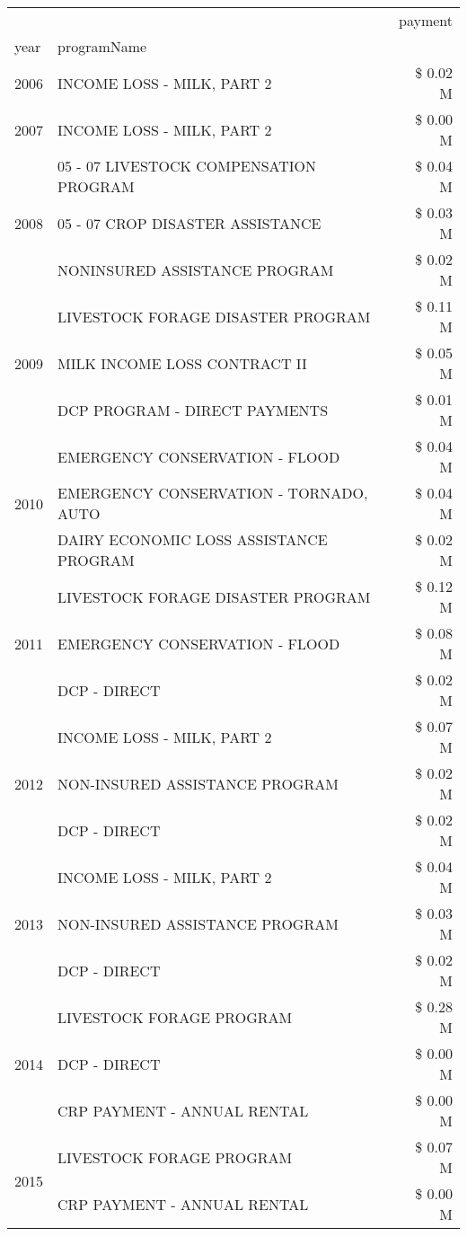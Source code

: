 \begin{tabular}{llr}
\toprule
 &  & payment \\
year & programName &  \\
\midrule
2006 & INCOME LOSS - MILK, PART 2 & \$ 0.02 M \\
\cline{1-3}
2007 & INCOME LOSS - MILK, PART 2 & \$ 0.00 M \\
\cline{1-3}
\multirow[t]{3}{*}{2008} & 05 - 07 LIVESTOCK COMPENSATION PROGRAM & \$ 0.04 M \\
 & 05 - 07 CROP DISASTER ASSISTANCE & \$ 0.03 M \\
 & NONINSURED ASSISTANCE PROGRAM & \$ 0.02 M \\
\cline{1-3}
\multirow[t]{3}{*}{2009} & LIVESTOCK FORAGE DISASTER  PROGRAM & \$ 0.11 M \\
 & MILK INCOME LOSS CONTRACT II & \$ 0.05 M \\
 & DCP PROGRAM - DIRECT PAYMENTS & \$ 0.01 M \\
\cline{1-3}
\multirow[t]{3}{*}{2010} & EMERGENCY CONSERVATION - FLOOD & \$ 0.04 M \\
 & EMERGENCY CONSERVATION - TORNADO, AUTO & \$ 0.04 M \\
 & DAIRY ECONOMIC LOSS ASSISTANCE PROGRAM & \$ 0.02 M \\
\cline{1-3}
\multirow[t]{3}{*}{2011} & LIVESTOCK FORAGE DISASTER PROGRAM & \$ 0.12 M \\
 & EMERGENCY CONSERVATION - FLOOD & \$ 0.08 M \\
 & DCP - DIRECT & \$ 0.02 M \\
\cline{1-3}
\multirow[t]{3}{*}{2012} & INCOME LOSS - MILK, PART 2 & \$ 0.07 M \\
 & NON-INSURED ASSISTANCE PROGRAM & \$ 0.02 M \\
 & DCP - DIRECT & \$ 0.02 M \\
\cline{1-3}
\multirow[t]{3}{*}{2013} & INCOME LOSS - MILK, PART 2 & \$ 0.04 M \\
 & NON-INSURED ASSISTANCE PROGRAM & \$ 0.03 M \\
 & DCP - DIRECT & \$ 0.02 M \\
\cline{1-3}
\multirow[t]{3}{*}{2014} & LIVESTOCK FORAGE PROGRAM & \$ 0.28 M \\
 & DCP - DIRECT & \$ 0.00 M \\
 & CRP PAYMENT - ANNUAL RENTAL & \$ 0.00 M \\
\cline{1-3}
\multirow[t]{3}{*}{2015} & LIVESTOCK FORAGE PROGRAM & \$ 0.07 M \\
 & CRP PAYMENT - ANNUAL RENTAL & \$ 0.00 M \\

\end{tabular}
